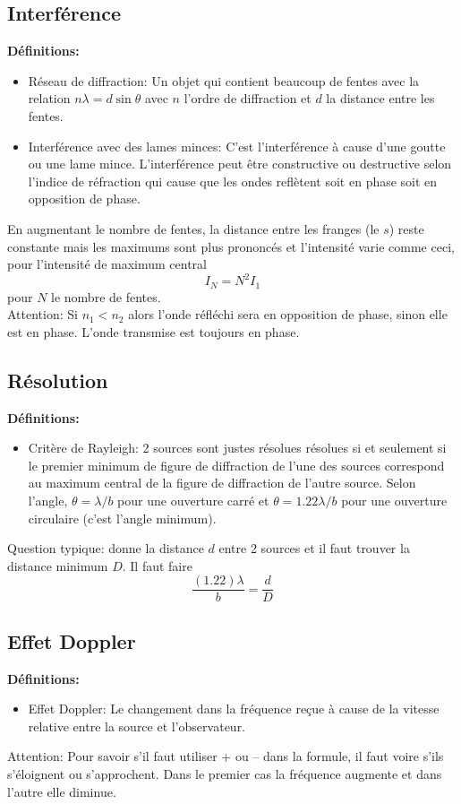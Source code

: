 \documentclass[french, a4paper, 12pt]{article}
\begin{document}
\subsection{Interférence}
\textbf{Définitions:}
\begin{itemize}
\item Réseau de diffraction: Un objet qui contient beaucoup de fentes avec la relation $n\lambda =d\sin \theta$ avec $n$ l'ordre de diffraction et $d$ la distance entre les fentes.
\item Interférence avec des lames minces: C'est l'interférence à cause d'une goutte ou une lame mince. L'interférence peut être constructive ou destructive selon l'indice de réfraction qui cause que les ondes reflètent soit en phase soit en opposition de phase.
\end{itemize}
En augmentant le nombre de fentes, la distance entre les franges (le $s$) reste constante mais les maximums sont plus prononcés et l'intensité varie comme ceci, pour l'intensité de maximum central
\[
I_N=N^2I_1
\]
pour $N$ le nombre de fentes.\\
Attention: Si $n_1 < n_2$ alors l'onde réfléchi sera en opposition de phase, sinon elle est en phase. L'onde transmise est toujours en phase.

\subsection{Résolution}
\textbf{Définitions:}
\begin{itemize}
\item Critère de Rayleigh: 2 sources sont justes résolues résolues si et seulement si le premier minimum de figure de diffraction de l'une des sources correspond au maximum central de la figure de diffraction de l'autre source. Selon l'angle, $\theta = \lambda /b$ pour une ouverture carré et $\theta = 1.22\lambda/b$ pour une ouverture circulaire (c'est l'angle minimum).
\end{itemize}
Question typique: donne la distance $d$ entre 2 sources et il faut trouver la distance minimum $D$. Il faut faire
\[
\frac{(1.22)\lambda}{b}=\frac{d}{D}
\]

\subsection{Effet Doppler}
\textbf{Définitions:}
\begin{itemize}
\item Effet Doppler: Le changement dans la fréquence reçue à cause de la vitesse relative entre la source et l'observateur.
\end{itemize}
Attention: Pour savoir s'il faut utiliser + ou -- dans la formule, il faut voire s'ils s'éloignent ou s'approchent. Dans le premier cas la fréquence augmente et dans l'autre elle diminue.
\pagebreak
\end{document}
